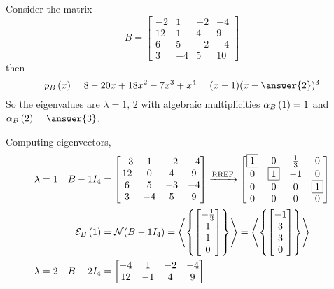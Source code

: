 \documentclass{ximera}
\begin{document}
\begin{example}
  Consider the matrix
  \[
    B=
    \begin{bmatrix}
      -2 & 1 & -2 & -4\\
      12 & 1 & 4 & 9\\
      6 & 5 & -2 & -4\\
      3 & -4 & 5 & 10
    \end{bmatrix}
  \]
  then
  \[
    \charpoly{B}{x}=8-20x+18x^2-7x^3+x^4=(x-1)(x-\answer{2})^3
  \]
  So the eigenvalues are $\lambda=1,\,2$ with algebraic multiplicities
  $\alpha_{B}\left(1\right)=1$ and $\algmult{B}{2}=\answer{3}$.

  Computing eigenvectors,
  \begin{align*}
    \lambda&=1&B- 1I_4&=
                        \begin{bmatrix}
                          -3 & 1 & -2 & -4\\
                          12 & 0 & 4 & 9\\
                          6 & 5 & -3 & -4\\
                          3 & -4 & 5 & 9
                        \end{bmatrix}
                                       \xrightarrow{\text{RREF}}
                                       \begin{bmatrix}
                                         \fbox{1} & 0 & \frac{1}{3} & 0\\
                                         0 & \fbox{1} & -1 & 0\\
                                         0 & 0 & 0 & \fbox{1}\\
                                         0 & 0 & 0 & 0
                                       \end{bmatrix}\\
           &&\mathcal{E}_{B}\left(1\right)&=\mathcal{N}\!\left(B-1I_4\right)
                                =\left\langle\left\{\begin{bmatrix}-\frac{1}{3}\\1\\1\\0\end{bmatrix}\right\}\right\rangle
    =\left\langle\left\{\begin{bmatrix}-1\\3\\3\\0\end{bmatrix}\right\}\right\rangle\\
    \lambda&=2&B-2I_4&=
                       \begin{bmatrix}
                         -4 & 1 & -2 & -4\\
                         12 & -1 & 4 & 9\\

\end{bmatrix}
\end{align*}
\end{example}
\end{document}

